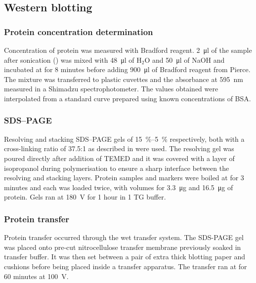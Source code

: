     \subsection{Western blotting}
      \subsubsection{Protein concentration determination}
        Concentration of protein was measured with Bradford reagent.
        \SI{2}{\ul} of the sample after sonication ()
        was mixed with \SI{48}{\ul} of H$_2$O and \SI{50}{\ul} of NaOH and
        incubated at  for 8 minutes before adding \SI{900}{\ul} of
        Bradford reagent from Pierce. The mixture was transferred to plastic
        cuvettes and the absorbance at \SI{595}{\nm} measured in a Shimadzu
        spectrophotometer. The values obtained were interpolated from a
        standard curve prepared using known concentrations of BSA.

      \subsubsection{SDS--PAGE}
        Resolving and stacking SDS--PAGE gels of \SIrange{15}{5}{\percent}
        respectively, both with a cross-linking ratio of \num{37.5}:1 as
        described in \citet{harlow_electrophoresis_1988} were used. The
        resolving gel was poured directly after addition
        of TEMED and it was covered with a layer of isopropanol during polymerisation
        to ensure a sharp interface between the resolving and stacking layers.
        Protein samples and markers were boiled at  for 3 minutes and each
        was loaded twice, with volumes for \SI{3.3}{\ug} and \SI{16.5}{\ug} of
        protein. Gels ran at \SI{180}{\volt} for 1 hour in \SI{1}{\X} TG buffer.

      \subsubsection{Protein transfer}
        Protein transfer occurred through the wet transfer system. The
        SDS-PAGE gel was placed onto pre-cut nitrocellulose transfer membrane
        previously soaked in transfer buffer. It was then set between a pair
        of extra thick blotting paper and cushions before being placed inside
        a transfer apparatus. The transfer ran at  for 60
        minutes at \SI{100}{\volt}.

